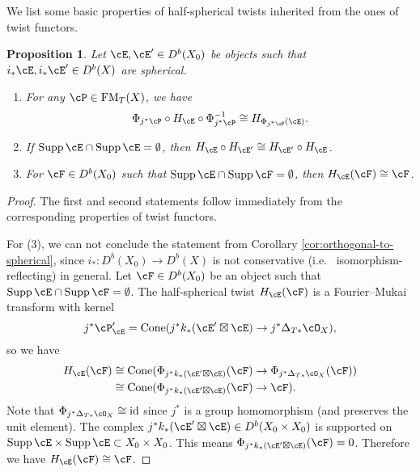 \documentclass[12pt]{amsart}
\numberwithin{equation}{section}
\theoremstyle{plain}
\newtheorem{proposition}[theorem]{Proposition}
\theoremstyle{definition}
\DeclareMathOperator{\Cone}{\mathrm{Cone}}
\DeclareMathOperator{\id}{\mathrm{id}}
\DeclareMathOperator{\Supp}{\mathrm{Supp}}
\DeclareMathOperator{\FM}{\mathrm{FM}}
\begin{document}
We list some basic properties of half-spherical twists inherited from the ones of twist functors.
\begin{proposition}\label{prop:empty-intersection}
    Let $\cE, \cE' \in D^b(X_0)$ be objects such that $i_*{\cE}, i_*{\cE'} \in D^b(X)$ are spherical.
    \begin{enumerate}
        \item For any $\cP \in \FM_T(X)$, we have\begin{equation}
                  \Phi_{j^* \cP} \circ H_{\cE} \circ \Phi_{j^* \cP}^{-1} \cong H_{\Phi_{j^* \cP}(\cE)}.
              \end{equation}
        \item If $\Supp \cE \cap \Supp \cE = \emptyset$, then $H_{\cE} \circ H_{\cE'} \cong H_{\cE'} \circ H_{\cE}$.
        \item For $\cF \in D^b(X_0)$ such that $\Supp \cE \cap \Supp \cF = \emptyset$, then $H_{\cE} (\cF) \cong \cF$.
    \end{enumerate}
\end{proposition}
\begin{proof}
    The first and second statements follow immediately from the corresponding properties of twist functors.

    For (3), we can not conclude the statement from Corollary \ref{cor:orthogonal-to-spherical}, since $i_* \colon D^b(X_0) \to D^b(X)$ is not conservative (i.e.~ isomorphism-reflecting) in general.
    Let $\cF \in D^b(X_0)$ be an object such that $\Supp \cE \cap \Supp \cF = \emptyset$.
    The half-spherical twist $H_{\cE}(\cF)$ is a Fourier--Mukai transform with kernel
    \begin{equation}
        j^*\cP'_{\cE} = \Cone(j^*k_*(\cE' \boxtimes \cE) \to j^*\Delta_{T*}\cO_X),
    \end{equation}
    so we have
    \begin{align}
        H_{\cE}(\cF) & \cong \Cone(\Phi_{j^*k_*(\cE' \boxtimes \cE)}(\cF) \to \Phi_{j^*\Delta_{T*}\cO_X}(\cF)) \\
                     & \cong \Cone(\Phi_{j^*k_*(\cE' \boxtimes \cE)}(\cF) \to \cF).
    \end{align}
    Note that $\Phi_{j^*\Delta_{T*}\cO_X} \cong \id$ since $j^*$ is a group homomorphism (and preserves the unit element).
    The complex $j^*k_*(\cE' \boxtimes \cE) \in D^b(X_0 \times X_0)$ is supported on $\Supp \cE \times \Supp \cE \subset X_0 \times X_0$.
    This means $\Phi_{j^*k_*(\cE' \boxtimes \cE)}(\cF) = 0$.
    Therefore we have $H_{\cE}(\cF) \cong \cF$.
\end{proof}
\end{document}
